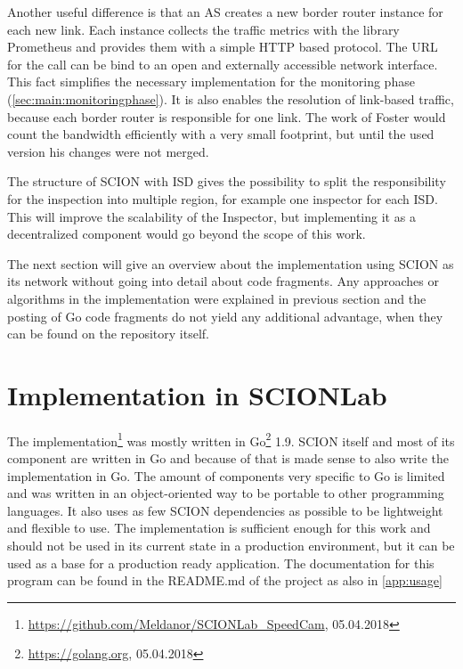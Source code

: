 \documentclass[thesis.tex]{subfiles}
\begin{document}
Another useful difference is that an AS creates a new border router instance for each new link. Each instance collects the traffic metrics with the library Prometheus and provides them with a simple HTTP based protocol. The URL for the call can be bind to an open and externally accessible network interface. This fact simplifies the necessary implementation for the monitoring phase (\autoref{sec:main:monitoringphase}). It is also enables the resolution of link-based traffic, because each border router is responsible for one link. The work of Foster\cite{Forster.September2017} would count the bandwidth efficiently with a very small footprint, but until the used version his changes were not merged. 

The structure of SCION with ISD gives the possibility to split the responsibility for the inspection into multiple region, for example one inspector for each ISD. This will improve the scalability of the Inspector, but implementing it as a decentralized component would go beyond the scope of this work.

The next section will give an overview about the implementation using SCION as its network without going into detail about code fragments. Any approaches or algorithms in the implementation were explained in previous section and the posting of Go code fragments do not yield any additional advantage, when they can be found on the repository itself.

\section{Implementation in SCIONLab} \label{sec:main:scionlabimpl}

The implementation\footnote{\url{https://github.com/Meldanor/SCIONLab_SpeedCam}, 05.04.2018} was mostly written in Go\footnote{\url{https://golang.org}, 05.04.2018} 1.9. SCION itself and most of its component are written in Go and because of that is made sense to also write the implementation in Go. The amount of components very specific to Go is limited and was written in an object-oriented way to be portable to other programming languages. It also uses as few SCION dependencies as possible to be lightweight and flexible to use. The implementation is sufficient enough for this work and should not be used in its current state in a production environment, but it can be used as a base for a production ready application. The documentation for this program can be found in the README.md of the project as also in \autoref{app:usage}
\end{document}
